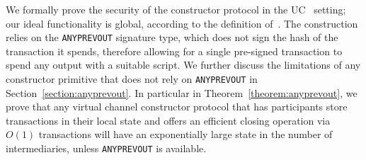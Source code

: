   We formally prove the security of the constructor protocol in the
  UC~\cite{uc} setting; our ideal functionality is global, according to the
  definition of~\cite{DBLP:conf/tcc/BadertscherCHTZ20}. The construction relies
  on the \texttt{ANYPREVOUT}
  signature type, which does not sign the hash of the transaction it spends,
  therefore allowing for a single pre-signed transaction to spend any output
  with a suitable script. We further discuss the limitations of any constructor
  primitive that does not rely on \texttt{ANYPREVOUT} in
  Section~\ref{section:anyprevout}. In particular in Theorem~\ref{theorem:anyprevout},
  we prove that any virtual channel constructor protocol that
  has participants store transactions in their local state
  and offers an efficient closing operation via $O(1)$ transactions
  will have an exponentially large state in the number of intermediaries, unless
  \texttt{ANYPREVOUT} is available. 
